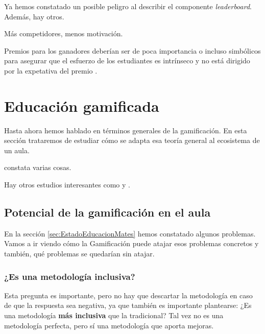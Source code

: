 \documentclass[a4paper, 12pt]{book}
\begin{document}
Ya hemos constatado un posible peligro al describir el componente \textit{leaderboard}. Además, hay otros.

Más competidores, menos motivación. \cite{n-effect}

Premios para los ganadores deberían ser de poca importancia o incluso simbólicos para asegurar que el esfuerzo de los estudiantes es intrínseco y no está dirigido por la expetativa del premio \cite{CompetitionInEd}.

\section{Educación gamificada}

Hasta ahora hemos hablado en términos generales de la gamificación. 
%
En esta sección trataremos de estudiar cómo se adapta esa teoría general al ecosistema de un aula.

\cite{lee2011gamification} constata varias cosas.

Hay otros estudios interesantes como \cite{Hanus2015152} y \cite{ReviewGamificationInEducation}.

\subsection{Potencial de la gamificación en el aula}

En la sección \ref{sec:EstadoEducacionMates} hemos constatado algunos problemas. 
%
Vamos a ir viendo cómo la Gamificación puede atajar esos problemas concretos y también, qué problemas se quedarían sin atajar.

\subsubsection{¿Es una metodología inclusiva?}

Esta pregunta es importante, pero no hay que descartar la metodología en caso de que la respuesta sea negativa, ya que también es importante plantearse:  ¿Es una metodología \textbf{más inclusiva} que la tradicional?
%
Tal vez no es una metodología perfecta, pero sí una metodología que aporta mejoras.



\end{document}
